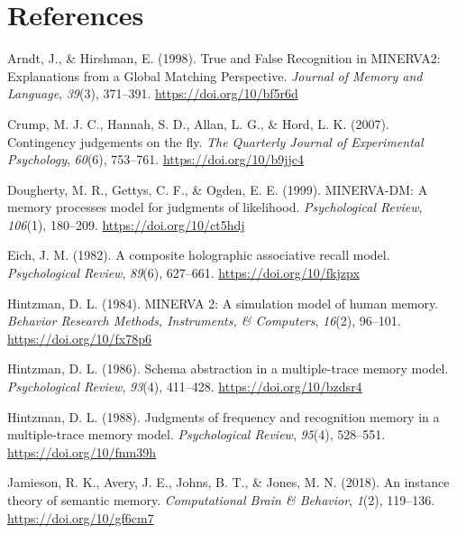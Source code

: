 \documentclass[
  english,
  man,floatsintext]{apa6}
\begin{document}
\newpage

\hypertarget{references}{%
\section{References}\label{references}}

\begingroup
\setlength{\parindent}{-0.5in}
\setlength{\leftskip}{0.5in}

\hypertarget{refs}{}
\leavevmode\hypertarget{ref-arndtTrueFalseRecognition1998}{}%
Arndt, J., \& Hirshman, E. (1998). True and False Recognition in MINERVA2: Explanations from a Global Matching Perspective. \emph{Journal of Memory and Language}, \emph{39}(3), 371--391. \url{https://doi.org/10/bf5r6d}

\leavevmode\hypertarget{ref-crumpContingencyJudgementsFly2007}{}%
Crump, M. J. C., Hannah, S. D., Allan, L. G., \& Hord, L. K. (2007). Contingency judgements on the fly. \emph{The Quarterly Journal of Experimental Psychology}, \emph{60}(6), 753--761. \url{https://doi.org/10/b9jjc4}

\leavevmode\hypertarget{ref-doughertyMINERVADMMemoryProcesses1999}{}%
Dougherty, M. R., Gettys, C. F., \& Ogden, E. E. (1999). MINERVA-DM: A memory processes model for judgments of likelihood. \emph{Psychological Review}, \emph{106}(1), 180--209. \url{https://doi.org/10/ct5hdj}

\leavevmode\hypertarget{ref-eichCompositeHolographicAssociative1982}{}%
Eich, J. M. (1982). A composite holographic associative recall model. \emph{Psychological Review}, \emph{89}(6), 627--661. \url{https://doi.org/10/fkjzpx}

\leavevmode\hypertarget{ref-hintzmanMINERVASimulationModel1984}{}%
Hintzman, D. L. (1984). MINERVA 2: A simulation model of human memory. \emph{Behavior Research Methods, Instruments, \& Computers}, \emph{16}(2), 96--101. \url{https://doi.org/10/fx78p6}

\leavevmode\hypertarget{ref-hintzmanSchemaAbstractionMultipletrace1986}{}%
Hintzman, D. L. (1986). Schema abstraction in a multiple-trace memory model. \emph{Psychological Review}, \emph{93}(4), 411--428. \url{https://doi.org/10/bzdsr4}

\leavevmode\hypertarget{ref-hintzmanJudgmentsFrequencyRecognition1988}{}%
Hintzman, D. L. (1988). Judgments of frequency and recognition memory in a multiple-trace memory model. \emph{Psychological Review}, \emph{95}(4), 528--551. \url{https://doi.org/10/fnm39h}

\leavevmode\hypertarget{ref-jamiesonInstanceTheorySemantic2018}{}%
Jamieson, R. K., Avery, J. E., Johns, B. T., \& Jones, M. N. (2018). An instance theory of semantic memory. \emph{Computational Brain \& Behavior}, \emph{1}(2), 119--136. \url{https://doi.org/10/gf6cm7}
\end{document}
